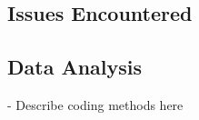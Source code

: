 \documentclass{sigchi}
\begin{document}
\subsection{Issues  Encountered}


\subsection{Data Analysis}
- Describe coding methods here

\begin{comment}
Age:
min      19.000000
25\%      20.000000
50\%      23.000000
75\%      34.000000
max      64.000000
mean     31.142857

< 20    0.190476
20s     0.428571
30s     0.142857
40s     0.095238
50s     0.047619
60+     0.095238

< 20    4
20s     9
30s     3
40s     2
50s     1
60+     2

M    14 (66.67\%)
F     7 (33.33\%)

Layperson          11
Data Worker         8
Super Layperson     2

Layperson          0.523810
Data Worker        0.380952
Super Layperson    0.095238

Student                                                     9
Professor                                                   2
Bartender                                                   1
Pedicab Driver and Barangay Official                        1
Revenue Assurance Manager                                   1
Baranggay Kagawad                                           1
Barista at Starbucks,SK chairman in Brgy Sta Mesa Manila    1
Senior Data Engineer                                        1
Barista                                                     1
Baranggay Captain,Textbook Distributor                      1
Barangay Kagawad                                            1
IT Consultant                                               1

	count	mean	std	min	25%
CLASSIFICATION								
Data Worker	8.0	31.250000	13.812520	19.0	22.00	29.5	34.00	62.0
Layperson	11.0	27.363636	14.541477	19.0	20.00	21.0	24.00	64.0
Super Layperson	2.0	51.500000	10.606602	44.0	47.75	51.5	55.25	59.0
\end{comment}
\end{document}
